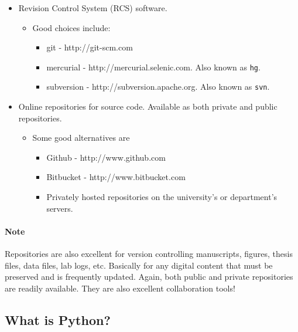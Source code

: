 \documentclass[11pt]{article}
\providecommand{\tightlist}{%
      \setlength{\itemsep}{0pt}\setlength{\parskip}{0pt}}
\begin{document}
\begin{itemize}
\tightlist
\item
  Revision Control System (RCS) software.

  \begin{itemize}
  \tightlist
  \item
    Good choices include:

    \begin{itemize}
    \tightlist
    \item
      git - http://git-scm.com
    \item
      mercurial - http://mercurial.selenic.com. Also known as
      \texttt{hg}.
    \item
      subversion - http://subversion.apache.org. Also known as
      \texttt{svn}.
    \end{itemize}
  \end{itemize}
\item
  Online repositories for source code. Available as both private and
  public repositories.

  \begin{itemize}
  \tightlist
  \item
    Some good alternatives are

    \begin{itemize}
    \tightlist
    \item
      Github - http://www.github.com
    \item
      Bitbucket - http://www.bitbucket.com
    \item
      Privately hosted repositories on the university's or department's
      servers.
    \end{itemize}
  \end{itemize}
\end{itemize}

\hypertarget{note}{%
\paragraph{Note}\label{note}}

Repositories are also excellent for version controlling manuscripts,
figures, thesis files, data files, lab logs, etc. Basically for any
digital content that must be preserved and is frequently updated. Again,
both public and private repositories are readily available. They are
also excellent collaboration tools!

    \hypertarget{what-is-python}{%
\subsection{What is Python?}\label{what-is-python}}
\end{document}
